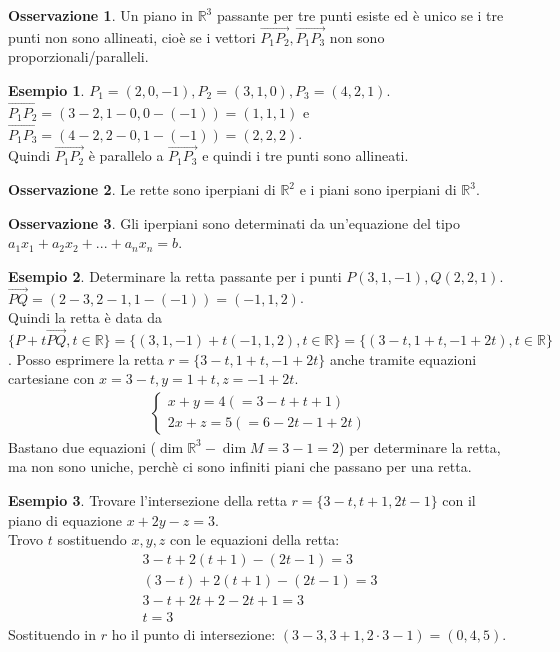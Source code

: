 \documentclass[a4paper]{article}
\theoremstyle{definition}
\newtheorem*{oss}{Osservazione}
\newtheorem*{es}{Esempio}
\begin{document}
	\begin{oss}
		Un piano in $\mathbb{R}^3$ passante per tre punti esiste ed è unico se i tre punti non sono allineati, cioè se i vettori $\overrightarrow{P_1P_2}, \overrightarrow{P_1P_3}$ non sono proporzionali/paralleli.
	\end{oss}

	\begin{es}
		$P_1 = (2, 0, -1), P_2 = (3, 1, 0), P_3 = (4, 2, 1)$. \\
		$\overrightarrow{P_1P_2} = (3 - 2, 1 - 0, 0 - (-1)) = (1, 1, 1)$ e $\overrightarrow{P_1P_3} = (4 - 2, 2 - 0, 1 - (-1)) = (2, 2, 2)$. \\
		Quindi $\overrightarrow{P_1P_2}$ è parallelo a $\overrightarrow{P_1P_3}$ e quindi i tre punti sono allineati.
	\end{es}

	\begin{oss}
		Le rette sono iperpiani di $\mathbb{R}^2$ e i piani sono iperpiani di $\mathbb{R}^3$.
	\end{oss}

	\begin{oss}
		Gli iperpiani sono determinati da un'equazione del tipo $a_1x_1 + a_2x_2 + ... + a_nx_n = b$.
	\end{oss}

	\begin{es}
		Determinare la retta passante per i punti $P(3, 1, -1), Q(2, 2, 1)$. \\
		$\overrightarrow{PQ} = (2 - 3, 2 - 1, 1 - (- 1)) = (-1, 1, 2)$. \\
		Quindi la retta è data da $\{P + t \overrightarrow{PQ}, t \in \mathbb{R}\} = \{(3, 1, -1) + t(-1, 1, 2), t \in \mathbb{R}\}
		= \{(3 - t, 1 + t, -1 + 2t), t \in \mathbb{R}\}$.
		Posso esprimere la retta $r = \{3 - t, 1 + t, -1 + 2t\}$ anche tramite equazioni cartesiane con $x = 3 - t, y = 1 + t, z = -1 + 2t$.
		\begin{align*}
			\begin{cases}
				x + y = 4 (= 3 - t + t + 1)\\
				2x + z = 5 (= 6 - 2t - 1 + 2t)
			\end{cases}
		\end{align*}
		Bastano due equazioni ($\dim \mathbb{R}^3 - \dim M = 3 - 1 = 2$) per determinare la retta, ma non sono uniche, perchè
		ci sono infiniti piani che passano per una retta.
	\end{es}

	\begin{es}
		Trovare l'intersezione della retta $r = \{3  -t, t + 1, 2t - 1\}$ con il piano di equazione $x + 2y - z = 3$. \\
		Trovo $t$ sostituendo $x, y, z$ con le equazioni della retta:
		\begin{align*}
			3 - t + 2(t + 1) - (2t - 1) = 3 \\
			(3 - t) + 2(t + 1) - (2t - 1) = 3 \\
			3 - t + 2t + 2 - 2t + 1 = 3 \\
			t = 3
		\end{align*}
		Sostituendo in $r$ ho il punto di intersezione: $(3 - 3, 3 + 1, 2 \cdot 3 - 1) = (0, 4, 5)$.
	\end{es}
\end{document}
